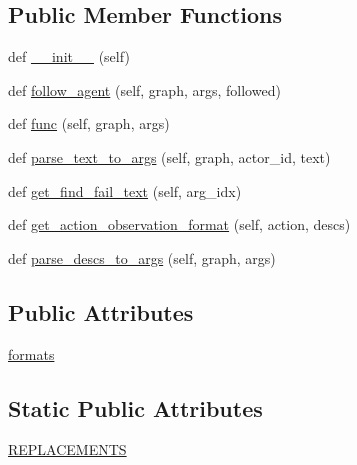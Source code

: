 \subsection*{Public Member Functions}
\begin{DoxyCompactItemize}
\item 
def \hyperlink{classlight__chats_1_1graph_1_1MoveAgentFunction_a817dbbcf1cf8973fb6227b6427d78bad}{\+\_\+\+\_\+init\+\_\+\+\_\+} (self)
\item 
def \hyperlink{classlight__chats_1_1graph_1_1MoveAgentFunction_adc15ccac3181a680d240e768a37b569e}{follow\+\_\+agent} (self, graph, args, followed)
\item 
def \hyperlink{classlight__chats_1_1graph_1_1MoveAgentFunction_a7ca8113d7746de96f740eaa61bda0c32}{func} (self, graph, args)
\item 
def \hyperlink{classlight__chats_1_1graph_1_1MoveAgentFunction_a107669f4e89172a53ac33649b9426439}{parse\+\_\+text\+\_\+to\+\_\+args} (self, graph, actor\+\_\+id, text)
\item 
def \hyperlink{classlight__chats_1_1graph_1_1MoveAgentFunction_a94bbc9319ec6a1a5229ded76406bfc58}{get\+\_\+find\+\_\+fail\+\_\+text} (self, arg\+\_\+idx)
\item 
def \hyperlink{classlight__chats_1_1graph_1_1MoveAgentFunction_a41f3e48e12425eab0bfc6cd5b8f3de0a}{get\+\_\+action\+\_\+observation\+\_\+format} (self, action, descs)
\item 
def \hyperlink{classlight__chats_1_1graph_1_1MoveAgentFunction_ac5ec1d33013cd1b2692d291f328e9a7b}{parse\+\_\+descs\+\_\+to\+\_\+args} (self, graph, args)
\end{DoxyCompactItemize}
\subsection*{Public Attributes}
\begin{DoxyCompactItemize}
\item 
\hyperlink{classlight__chats_1_1graph_1_1MoveAgentFunction_af70bc014668a0da4126b2edb64f71d98}{formats}
\end{DoxyCompactItemize}
\subsection*{Static Public Attributes}
\begin{DoxyCompactItemize}
\item 
\hyperlink{classlight__chats_1_1graph_1_1MoveAgentFunction_a7757c7aebcb3df4202c8aebdea0746cf}{R\+E\+P\+L\+A\+C\+E\+M\+E\+N\+TS}
\end{DoxyCompactItemize}



